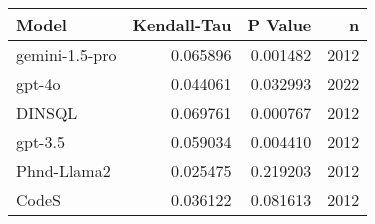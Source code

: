 \begin{tabular}{lrrr}
\toprule
Model & Kendall-Tau & P Value & n \\
\midrule
gemini-1.5-pro & 0.065896 & 0.001482 & 2012 \\
gpt-4o & 0.044061 & 0.032993 & 2022 \\
DINSQL & 0.069761 & 0.000767 & 2012 \\
gpt-3.5 & 0.059034 & 0.004410 & 2012 \\
Phnd-Llama2 & 0.025475 & 0.219203 & 2012 \\
CodeS & 0.036122 & 0.081613 & 2012 \\
\bottomrule
\end{tabular}
